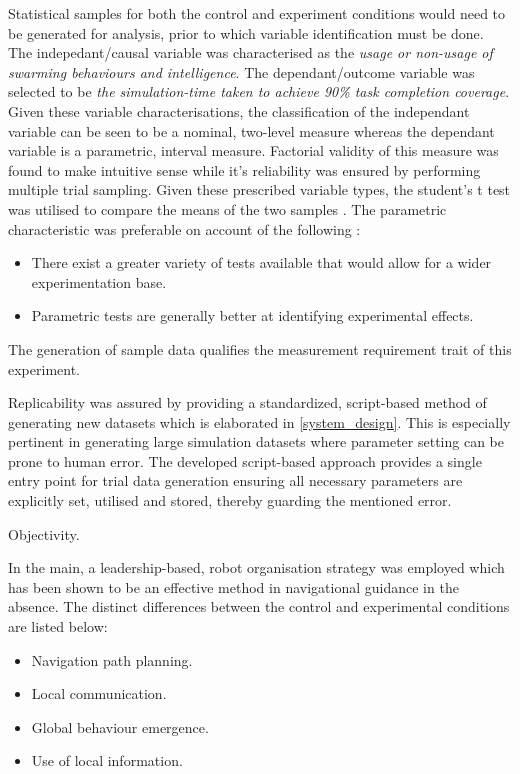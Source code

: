 \documentclass{report}
\begin{document}
Statistical samples for both the control and experiment conditions would need to be generated for analysis, prior to which variable identification must be done. The indepedant/causal variable was characterised as the \textit{usage or non-usage of swarming behaviours and intelligence}. The dependant/outcome variable was selected to be \textit{the simulation-time taken to achieve 90\% task completion coverage}. Given these variable characterisations, the classification of the independant variable can be seen to be a nominal, two-level measure whereas the dependant variable is a parametric, interval measure. Factorial validity of this measure was found to make intuitive sense \cite{Field2012} while it's reliability was ensured by performing multiple trial sampling. Given these prescribed variable types, the student's t test was utilised to compare the means of the two samples \cite{Donald2008}. The parametric characteristic was preferable on account of the following \cite{Field2012}:
\begin{itemize}
	\item There exist a greater variety of tests available that would allow for a wider experimentation base.
	\item Parametric tests are generally better at identifying experimental effects.
\end{itemize}
The generation of sample data qualifies the measurement requirement trait of this experiment.

Replicability was assured by providing a standardized, script-based method of generating new datasets which is elaborated in \ref{system_design}. This is especially pertinent in generating large simulation datasets where parameter setting can be prone to human error. The developed script-based approach provides a single entry point for trial data generation ensuring all necessary parameters are explicitly set, utilised and stored, thereby guarding the mentioned error.

Objectivity.

In the main, a leadership-based, robot organisation strategy was employed which has been shown \cite{Dyer2008} to be an effective method in navigational guidance in the absence. The distinct differences between the control and experimental conditions are listed below:
\begin{itemize}
	\item Navigation path planning.
	\item Local communication.
	\item Global behaviour emergence.
	\item Use of local information.
\end{itemize}
\end{document}
